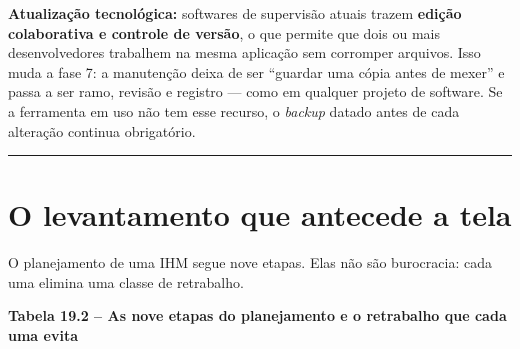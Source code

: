 \begin{caixanota}

\textbf{Atualização tecnológica:} softwares de supervisão atuais trazem \textbf{edição colaborativa e
controle de versão}, o que permite que dois ou mais desenvolvedores trabalhem na mesma aplicação
sem corromper arquivos. Isso muda a fase 7: a manutenção deixa de ser ``guardar uma cópia antes de
mexer'' e passa a ser ramo, revisão e registro --- como em qualquer projeto de software. Se a
ferramenta em uso não tem esse recurso, o \emph{backup} datado antes de cada alteração continua
obrigatório.

\end{caixanota}

\begin{center}\rule{0.5\linewidth}{0.5pt}\end{center}

\section{O levantamento que antecede a tela}\label{o-levantamento-que-antecede-a-tela}

O planejamento de uma IHM segue nove etapas. Elas não são burocracia: cada uma elimina uma classe de
retrabalho.

\textbf{Tabela 19.2 -- As nove etapas do planejamento e o retrabalho que cada uma evita}


